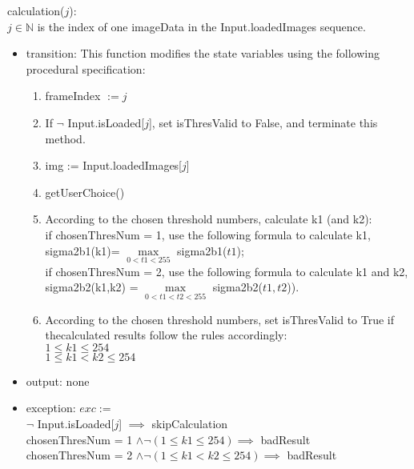 \documentclass[12pt, titlepage]{article}
\begin{document}
\noindent calculation($j$):\\
$j \in \mathbb{N}$ is the index of one imageData in the Input.loadedImages
sequence.
\begin{itemize}
\item transition: 
This function modifies
the state variables using the following procedural specification:
\begin{enumerate}
\item frameIndex $:= j$
\item If $\neg$ Input.isLoaded[$j$], set isThresValid to False, and terminate
this method.
\item img := Input.loadedImages[$j$]
\item getUserChoice()
\item According to the chosen threshold numbers, calculate k1 (and k2):\\
if chosenThresNum = 1, use the following formula to calculate k1,\\
sigma2b1(k1)= $\max\limits_{0< t1<255}$ sigma2b1($t1$);\\
if chosenThresNum = 2, use the following formula to calculate k1 and k2,\\
sigma2b2(k1,k2) =
$\max\limits_{0<t1<t2<255}$ sigma2b2($t1,t2$)).
\item According to the chosen threshold numbers, set isThresValid to True if
thecalculated results follow the rules accordingly:\\
$1 \le k1 \le 254$\\
$1 \le k1 < k2 \le 254$
\end{enumerate}
\item output: none
\item exception: $exc :=$\\
$\neg$ Input.isLoaded[$j$] $\implies$ skipCalculation\\
chosenThresNum = 1 $\land \neg (1 \le k1 \le 254) \implies$
badResult\\
chosenThresNum = 2 $\land \neg (1 \le k1 < k2 \le 254) \implies$ badResult
\end{itemize}
\end{document}
